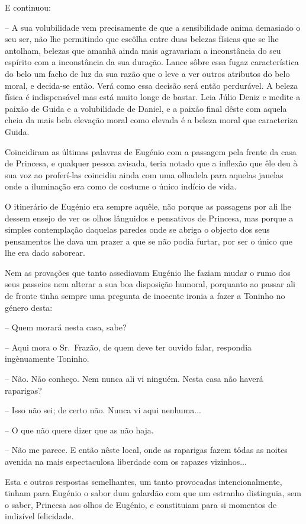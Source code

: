 \documentclass[9pt]{article}
\begin{document}
E continuou:

-- A sua volubilidade vem precisamente de que a sensibilidade anima demasiado o seu ser, não lhe permitindo que escô\-lha entre duas belezas físicas
que se lhe anto\-lham, belezas que a\-ma\-nhã ainda mais agravariam a inconstância
do seu espírito com a inconstância da sua dura\-ção. Lance sôbre essa fugaz
característica do belo um facho de luz da sua razão que o leve a ver outros atributos do belo moral, e decida-se então. Verá como essa decisão será então perdurável. A beleza física é indispensável mas está muito longe de bastar. Leia
Júlio Deniz e medite a paixão de Guida e a volubilidade de Daniel, e a paixão
final dêste com aquela cheia da mais bela eleva\-ção moral como elevada é a
beleza moral que ca\-ra\-cte\-ri\-za Guida.

Coincidiram as últimas palavras de Eugé\-nio com a passagem pela frente
da casa de Princesa, e qualquer pessoa avisada, teria notado que a inflexão
que êle deu à sua voz ao proferí-las coincidiu ainda com uma o\-lhadela para
aquelas janelas onde a ilumina\-ção era como de costume o único indício de vida.

O itinerário de Eugé\-nio era sempre a\-quê\-le, não porque as passagens por
ali lhe dessem ensejo de ver os o\-lhos lânguidos e pensativos de Princesa, mas porque a simples contempla\-ção daquelas paredes onde se abriga o objecto dos seus pensamentos lhe dava um prazer a que se não podia furtar, por ser
o único que lhe era dado saborear.

Nem as prova\-ções que tanto assediavam Eugé\-nio lhe faziam mudar o rumo
dos seus passeios nem alterar a sua boa disposi\-ção humoral, por\-quanto ao passar ali de fronte tinha sempre uma pregunta de inocente ironia a fazer a Toninho no género desta:

-- Quem morará nesta casa, sabe?

-- Aqui mora o Sr.\ Frazão, de quem deve ter ouvido falar, respondia ingènuamente Toninho.

-- Não. Não conheço. Nem nunca ali vi nin\-guém. Nesta casa não haverá
raparigas?

 -- Isso não sei; de certo não. Nunca vi aqui nenhuma...

-- O que não quere dizer que as não haja.

-- Não me parece. E então nês\-te local, onde as raparigas fazem tôdas as
noites avenida na mais espectaculosa liberdade com os rapazes vizinhos...

Esta e outras respostas seme\-lhantes, um tanto provocadas in\-ten\-cio\-nalmente, tinham para Eugé\-nio o sabor dum galardão com que um estranho distinguia,
sem o saber, Princesa aos o\-lhos de Eugé\-nio, e constituiam para si momentos de
indizível felicidade.
\end{document}
